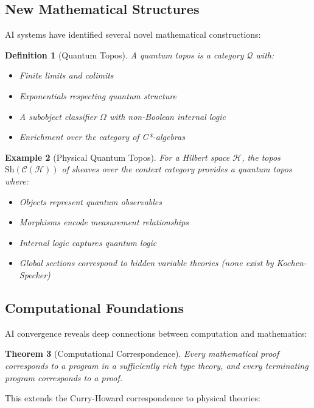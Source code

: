 \documentclass[11pt,a4paper]{article}
\newtheorem{theorem}{Theorem}[section]
\newtheorem{definition}[theorem]{Definition}
\newtheorem{example}[theorem]{Example}
\begin{document}
\subsection{New Mathematical Structures}

AI systems have identified several novel mathematical constructions:

\begin{definition}[Quantum Topos]
A quantum topos is a category $\mathcal{Q}$ with:
\begin{itemize}
    \item Finite limits and colimits
    \item Exponentials respecting quantum structure
    \item A subobject classifier $\Omega$ with non-Boolean internal logic
    \item Enrichment over the category of C*-algebras
\end{itemize}
\end{definition}

\begin{example}[Physical Quantum Topos]
For a Hilbert space $\mathcal{H}$, the topos $\text{Sh}(\mathcal{C}(\mathcal{H}))$ of sheaves over the context category provides a quantum topos where:
\begin{itemize}
    \item Objects represent quantum observables
    \item Morphisms encode measurement relationships
    \item Internal logic captures quantum logic
    \item Global sections correspond to hidden variable theories (none exist by Kochen-Specker)
\end{itemize}
\end{example}

\subsection{Computational Foundations}

AI convergence reveals deep connections between computation and mathematics:

\begin{theorem}[Computational Correspondence]
Every mathematical proof corresponds to a program in a sufficiently rich type theory, and every terminating program corresponds to a proof.
\end{theorem}

This extends the Curry-Howard correspondence to physical theories:
\end{document}
